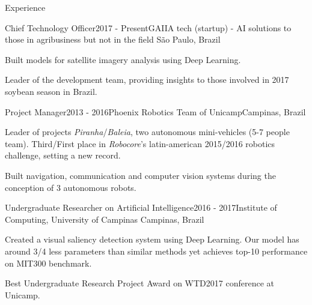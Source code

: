 \documentclass[8pt]{resume}
\newcommand{\tit}[1]{\textit{#1}}
\begin{document}
\begin{rSection}{Experience}

    \begin{rSubsection}{Chief Technology Officer}{2017 - Present}{GAIIA tech (startup) - AI solutions to those in agribusiness but not in the field}
    {São Paulo, Brazil}
    \item Built models for satellite imagery analysis using Deep Learning.
    \item Leader of the development team, providing insights to
        those involved in 2017 soybean season in Brazil.
\end{rSubsection}

\begin{rSubsection}{Project Manager}{2013 - 2016}{Phoenix Robotics Team of Unicamp}{Campinas, Brazil}
\item Leader of projects \tit{Piranha}/\tit{Baleia},
        two autonomous mini-vehicles (5-7 people team).
        Third/First place in \tit{Robocore}'s latin-american 2015/2016 robotics
        challenge, setting a new record.
    \item Built navigation, communication and computer vision systems
        during the conception of 3 autonomous robots.
\end{rSubsection}

\begin{rSubsection}{Undergraduate Researcher on Artificial Intelligence}{2016 - 2017}{Institute of Computing, University of Campinas}
    {Campinas, Brazil}
    \item Created a visual saliency detection system using Deep Learning.
        Our model has around 3/4 less parameters than similar methods yet
        achieves top-10 performance on MIT300 benchmark.
    \item Best Undergraduate Research Project Award on WTD2017 conference at
        Unicamp.
\end{rSubsection}


\end{rSection}
\end{document}
